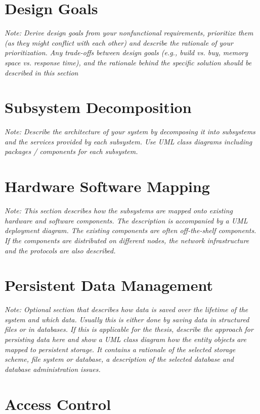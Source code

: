 \documentclass[a4paper,12pt,twoside]{report}
\begin{document}
\section{Design Goals}

\textit{Note: Derive design goals from your nonfunctional requirements, prioritize them (as they might conflict with each other) and describe the rationale of your prioritization. Any trade-offs between design goals (e.g., build vs. buy, memory space vs. response time),
and the rationale behind the specific solution should be described in this section}

\section{Subsystem Decomposition}

\textit{Note: Describe the architecture of your system by decomposing it into subsystems and the services provided by each subsystem. Use UML class diagrams including packages / components for each subsystem.}

\section{Hardware Software Mapping}

\textit{Note: This section describes how the subsystems are mapped onto existing hardware and software components. The description is accompanied by a UML deployment diagram. The existing components are often off-the-shelf components. If the components are distributed on different nodes, the network infrastructure and the protocols are also described.}

\section{Persistent Data Management}

\textit{Note: Optional section that describes how data is saved over the lifetime of the system and which data. Usually this is either done by saving data in structured files or in databases. If this is applicable for the thesis, describe the approach for persisting data here and show a UML class diagram how the entity objects are mapped to persistent storage.
It contains a rationale of the selected storage scheme, file system or database, a description of the selected database and database administration issues.}

\section{Access Control}
\end{document}
